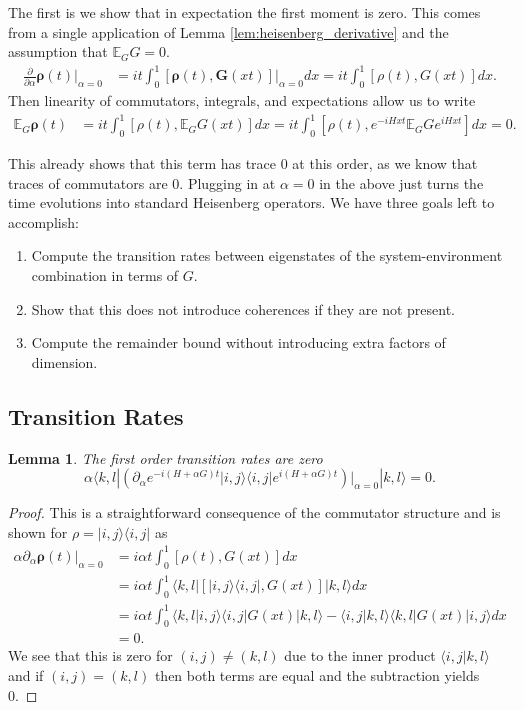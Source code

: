 \documentclass[
 amsmath,amssymb,
 aps,
onecolumn, 
nofootinbib]{revtex4-2}
\newtheorem{lemma}[theorem]{Lemma}
\newcommand{\ket}[1]{|#1\rangle}
\newcommand{\bra}[1]{\langle #1|}
\newcommand{\braket}[2]{\langle #1|#2\rangle}
\newcommand{\ketbra}[2]{| #1\rangle\! \langle #2|}
\newcommand{\EE}{\mathbb{E}}
\begin{document}
The first is we show that in expectation the first moment is zero. This comes from a single application of Lemma \ref{lem:heisenberg_derivative} and the assumption that $\EE_G G = 0$.
\begin{align}
    \frac{\partial}{\partial \alpha} \boldsymbol{\rho}(t)\bigg|_{\alpha = 0} &= it \int_0^1 [\boldsymbol{\rho}(t), \boldsymbol{G}(x t)] \bigg|_{\alpha = 0} d x = it \int_0^1 [\rho(t), G(xt)] dx.
\end{align}
Then linearity of commutators, integrals, and expectations allow us to write
\begin{align}
    \EE_G \boldsymbol{\rho}(t) &= it \int_0^1 [\rho(t), \EE_G G(xt) ] dx = it \int_0^1 [\rho(t), e^{-i H xt} \EE_G G e^{i H x t}] dx = 0.
\end{align}




This already shows that this term has trace 0 at this order, as we know that traces of commutators are 0. Plugging in at $\alpha = 0$ in the above just turns the time evolutions into standard Heisenberg operators. We have three goals left to accomplish: 
\begin{enumerate}
    \item Compute the transition rates between eigenstates of the system-environment combination in terms of $G$. 
    \item Show that this does not introduce coherences if they are not present.
    \item Compute the remainder bound without introducing extra factors of dimension. 
\end{enumerate}

\subsection{Transition Rates}

\begin{lemma}
    The first order transition rates are zero 
    \begin{equation}
        \alpha \bra{k,l} \left(\partial_\alpha e^{-i (H + \alpha G)t} \ketbra{i,j}{i,j} e^{i (H + \alpha G )t} \right) \bigg|_{\alpha = 0}  \ket{k,l} = 0.
    \end{equation}
\end{lemma}
\begin{proof}
    This is a straightforward consequence of the commutator structure and is shown for $\rho = \ketbra{i,j}{i,j}$ as
    \begin{align}
    \alpha \partial_\alpha \boldsymbol{\rho}(t)\big|_{\alpha = 0} &= i \alpha t \int_0^1 [\rho(t), G(x t)] d x \\
          &= i \alpha t \int_0^1 \bra{k,l}[\ketbra{i,j}{i,j},G(xt)] \ket{k,l} dx \\
        &= i \alpha t \int_0^1 \braket{k,l}{i,j} \bra{i,j}G(xt) \ket{k,l} - \braket{i,j}{k,l} \bra{k,l}G(xt) \ket{i,j} dx \\
        &= 0.
    \end{align}
    We see that this is zero for $(i,j) \neq (k,l)$ due to the inner product $\braket{i,j}{k,l}$ and if $(i,j) = (k,l)$ then both terms are equal and the subtraction yields 0.
\end{proof}
\end{document}
